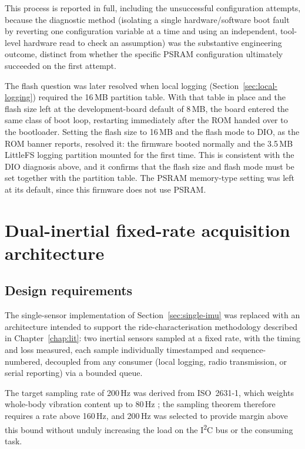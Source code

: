This process is reported in full, including the unsuccessful configuration attempts, because the diagnostic method (isolating a single hardware/software boot fault by reverting one configuration variable at a time and using an independent, tool-level hardware read to check an assumption) was the substantive engineering outcome, distinct from whether the specific PSRAM configuration ultimately succeeded on the first attempt.

The flash question was later resolved when local logging (Section~\ref{sec:local-logging}) required the 16\,MB partition table. With that table in place and the flash size left at the development-board default of 8\,MB, the board entered the same class of boot loop, restarting immediately after the ROM handed over to the bootloader. Setting the flash size to 16\,MB and the flash mode to DIO, as the ROM banner reports, resolved it: the firmware booted normally and the 3.5\,MB LittleFS logging partition mounted for the first time. This is consistent with the DIO diagnosis above, and it confirms that the flash size and flash mode must be set together with the partition table. The PSRAM memory-type setting was left at its default, since this firmware does not use PSRAM.

\section{Dual-inertial fixed-rate acquisition architecture}
\label{sec:dual-imu-architecture}

\subsection{Design requirements}

The single-sensor implementation of Section~\ref{sec:single-imu} was replaced with an architecture intended to support the ride-characterisation methodology described in Chapter~\ref{chap:lit}: two inertial sensors sampled at a fixed rate, with the timing and loss measured, each sample individually timestamped and sequence-numbered, decoupled from any consumer (local logging, radio transmission, or serial reporting) via a bounded queue.

The target sampling rate of 200\,Hz was derived from ISO~2631-1, which weights whole-body vibration content up to 80\,Hz \cite{iso2631}; the sampling theorem therefore requires a rate above 160\,Hz, and 200\,Hz was selected to provide margin above this bound without unduly increasing the load on the I\textsuperscript{2}C bus or the consuming task.

